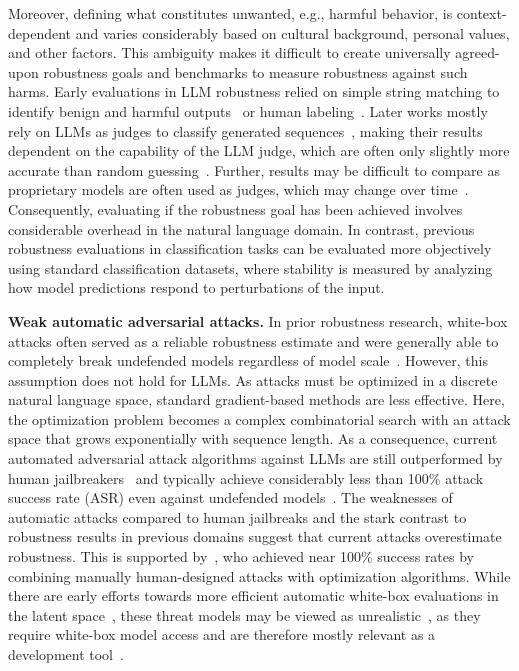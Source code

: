 Moreover, defining what constitutes unwanted, e.g., harmful behavior, is context-dependent and varies considerably based on cultural background, personal values, and other factors. This ambiguity makes it difficult to create universally agreed-upon robustness goals and benchmarks to measure robustness against such harms. Early evaluations in LLM robustness relied on simple string matching to identify benign and harmful outputs~\cite{zou2023universal} or human labeling~\cite{zhu2023autodan}. Later works mostly rely on LLMs as judges to classify generated sequences~\cite{zhu2023autodan, mazeika2024harmbench}, making their results dependent on the capability of the LLM judge, which are often only slightly more accurate than random guessing~\cite{tan2024judgebench, shi2024judging}. Further, results may be difficult to compare as proprietary models are often used as judges, which may change over time~\cite{zhu2023autodan}. Consequently, evaluating if the robustness goal has been achieved involves considerable overhead in the natural language domain. 
In contrast, previous robustness evaluations in classification tasks can be evaluated more objectively using standard classification datasets, where stability is measured by analyzing how model predictions respond to perturbations of the input.

\textbf{Weak automatic adversarial attacks.} In prior robustness research, white-box attacks often served as a reliable robustness estimate and were generally able to completely break undefended models regardless of model scale~\cite{shao2021adversarial}. However, this assumption does not hold for LLMs. As attacks must be optimized in a discrete natural language space, standard gradient-based methods are less effective. Here, the optimization problem becomes a complex combinatorial search with an attack space that grows exponentially with sequence length. As a consequence, current automated adversarial attack algorithms against LLMs are still outperformed by human jailbreakers~\cite{li2024llm} and typically achieve considerably less than 100\% attack success rate (ASR) even against undefended models~\cite{zou2023universal}. The weaknesses of automatic attacks compared to human jailbreaks and the stark contrast to robustness results in previous domains suggest that current attacks overestimate robustness. This is supported by~\citet{andriushchenko2024jailbreaking}, who achieved near 100\% success rates by combining manually human-designed attacks with optimization algorithms. While there are early efforts towards more efficient automatic white-box evaluations in the latent space~\cite{schwinn2023adversarial, schwinn2024soft, che2025model}, these threat models may be viewed as unrealistic~\cite{zou2024improving}, as they require white-box model access and are therefore mostly relevant as a development tool~\cite{che2025model}.

